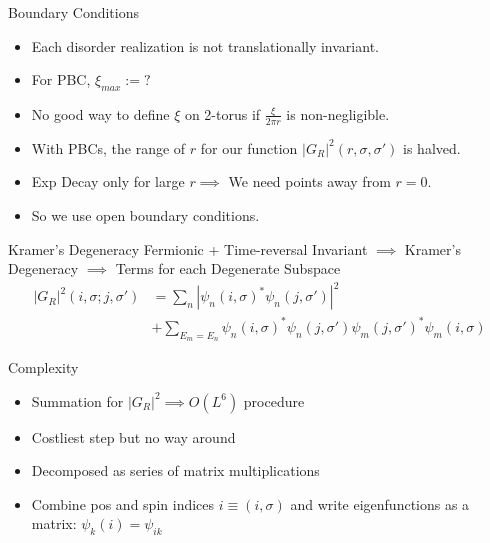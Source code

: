 \documentclass[]{beamer}
\begin{document}
\begin{frame}{Boundary Conditions}
    \begin{itemize}
        \item Each disorder realization is not
        translationally invariant.
        \item For PBC, $\xi_{max} := ?$
        \item No good way to define $\xi$ on 2-torus if
        $\frac{\xi}{2\pi r}$ is
        non-negligible.
        \item With PBCs, the range of $r$ for our function
        $|G_R|^2(r,\sigma,\sigma')$ is halved. 
        \item Exp Decay only for large $r \implies$ We need
        points away from $r = 0$. 
        \item So we use open boundary conditions.
    \end{itemize}
\end{frame}

\begin{frame}{Kramer's Degeneracy}
    Fermionic + Time-reversal Invariant $\implies$ Kramer's Degeneracy
    $\implies$ Terms for each Degenerate Subspace
    \begin{align*}
        |G_R|^2(i,\sigma;j,\sigma') &= \sum_n |\psi_n(i,\sigma)^* \psi_n(j,\sigma')|^2\\
        &+ \sum_{E_m = E_n} \psi_n(i,\sigma)^*\psi_n(j,\sigma')\psi_m(j,\sigma')^*\psi_m(i,\sigma)
    \end{align*}
\end{frame}

\begin{frame}{Complexity}
    \begin{itemize}
        \item Summation for $|G_R|^2 \implies O(L^6)$ procedure
        \item Costliest step but no way around
        \item Decomposed as series of matrix multiplications
        \item Combine pos and spin indices $i \equiv
        (i,\sigma)$ and write eigenfunctions as a matrix:
        $\psi_k(i) = \psi_{ik}$
    \end{itemize}
\end{frame}
\end{document}
